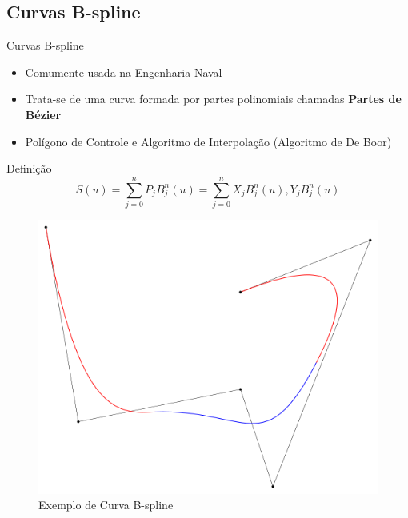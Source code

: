 \documentclass{beamer}
\begin{document}
\subsection{Curvas B-spline}
\begin{frame}{Curvas B-spline}
\begin{itemize}
\item Comumente usada na Engenharia Naval
\item Trata-se de uma curva formada por partes polinomiais chamadas \textbf{Partes de Bézier}
\item Polígono de Controle e Algoritmo de Interpolação (Algoritmo de De Boor)
\end{itemize}

\begin{block}{Definição}
	\begin{equation}
		S(u) = \sum_{j = 0}^{n} {P_j B_j^n(u)} = \sum_{j = 0}^{n} {X_j B_j^n(u),Y_j B_j^n(u)}
	\end{equation}
\end{block}

\begin{figure}[h]
	\centering
	\includegraphics[scale=0.15]{bspline}
	\caption{Exemplo de Curva B-spline}
	\label{fig:bspline}
\end{figure}
\end{frame}

\end{document}
